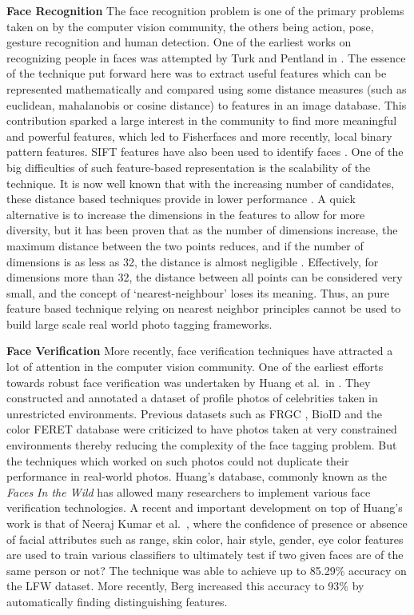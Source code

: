 \textbf{Face Recognition}
The face recognition problem is one of the primary problems taken on by the computer vision community, the others being action, pose, gesture recognition and human detection. One of the earliest works on recognizing people in faces was attempted by Turk and Pentland in \cite{turk1991eigenfaces}. The essence of the technique put forward here was to extract useful features which can be represented mathematically and compared using some distance measures (such as euclidean, mahalanobis or cosine distance) to features in an image database. This contribution sparked a large interest in the community to find more meaningful and powerful features, which led to Fisherfaces \cite{belhumeur1997eigenfaces} and more recently, local binary pattern \cite{ahonen2006face} features. SIFT features have also been used to identify faces \cite{bicego2006use, geng2009sift, luo2007person}. One of the big difficulties of such feature-based representation is the scalability of the technique. It is now well known that with the increasing number of candidates, these distance based techniques provide in lower performance \cite{wu2004probability}. A quick alternative is to increase the dimensions in the features to allow for more diversity, but it has been proven that as the number of dimensions increase, the maximum distance between the two points reduces, and if the number of dimensions is as less as 32, the distance is almost negligible \cite{beyer1999nearest}. Effectively, for dimensions more than 32, the distance between all points can be considered very small, and the concept of `nearest-neighbour' loses its meaning. Thus, an pure feature based technique relying on nearest neighbor principles cannot be used to build large scale real world photo tagging frameworks.

\textbf{Face Verification}
More recently, face verification techniques have attracted a lot of attention in the computer vision community. One of the earliest efforts towards robust face verification was undertaken by Huang et al.\ in \cite{huang2007labeled}. They constructed and annotated a dataset of profile photos of celebrities taken in unrestricted environments. Previous datasets such as FRGC \cite{phillips2005overview}, BioID \cite{jesorsky2001robust} and the color FERET database \cite{phillips1998feret} were criticized to have photos taken at very constrained environments thereby reducing the complexity of the face tagging problem. But the techniques which worked on such photos could not duplicate their performance in real-world photos. Huang's database, commonly known as the \textit{Faces In the Wild} has allowed many researchers to implement various face verification technologies. A recent and important development on top of Huang's work is that of Neeraj Kumar et al.\ \cite{nk_attribute_classifiers}, where the confidence of presence or absence of facial attributes such as range, skin color, hair style, gender, eye color features are used to train various classifiers to ultimately test if two given faces are of the same person or not? The technique was able to achieve up to 85.29\% accuracy on the LFW dataset. More recently, Berg \cite{berg2012tom} increased this accuracy to 93\% by automatically finding distinguishing features.

